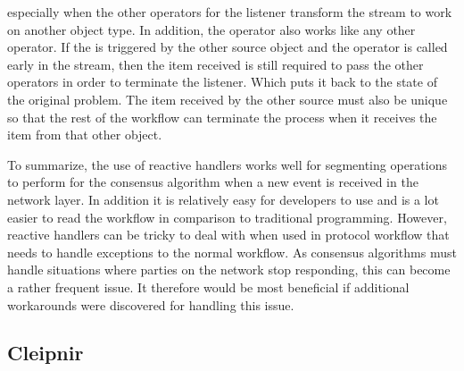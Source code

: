 especially when the other operators for the listener transform the stream to work on another object type. In addition, the  operator also works like any other operator. If the  is triggered by the other source object and the operator is called early in the stream, then the item received is still required to pass the other operators in order to terminate the listener. Which puts it back to the state of the original problem. The item received by the other source must also be unique so that the rest of the workflow can terminate the process when it receives the item from that other  object.

To summarize, the use of reactive handlers works well for segmenting operations to perform for the consensus algorithm when a new event is received in the network layer. In addition it is relatively easy for developers to use and is a lot easier to read the workflow in comparison to traditional programming. However, reactive handlers can be tricky to deal with when used in protocol workflow that needs to handle exceptions to the normal workflow. As consensus algorithms must handle situations where parties on the network stop responding, this can become a rather frequent issue. It therefore would be most beneficial if additional workarounds were discovered for handling this issue.  

\subsection{Cleipnir}

